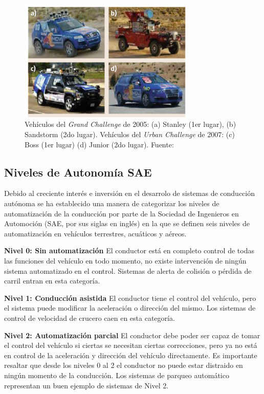 \begin{figure}[!h] 
    \centering
    \includegraphics[width=0.75\textwidth]{img/darpa}
    \caption[Vehículos del \textit{Grand Challenge}]{Vehículos del \textit{Grand Challenge} de 2005: (a) Stanley (1er lugar), (b) Sandstorm (2do lugar). Vehículos del \textit{Urban Challenge} de 2007: (c) Boss (1er lugar) (d) Junior (2do lugar). Fuente: \cite{wikipedia_2018} }
    \label{fig:darpa}
\end{figure}



    \subsection{Niveles de Autonomía SAE}
    Debido al creciente interés e inversión en el desarrolo de sistemas de conducción autónoma se ha establecido 
    una manera de categorizar los niveles de automatización de la conducción por parte de  la Sociedad de Ingenieros en Automoción
    (SAE, por sus siglas en inglés) en la que se definen seis niveles de automatización en vehículos terrestres, acuáticos y aéreos.

        \textbf{Nivel 0: Sin automatización}
        El conductor está en completo control de todas las funciones del vehículo en todo momento, no existe intervención 
        de ningún sistema automatizado en el control. Sistemas de alerta de colisión o pérdida de carril entran en esta categoría.
        
        \textbf{Nivel 1: Conducción asistida}
        El conductor tiene el control del vehículo, pero el sistema puede modificar la aceleración o dirección del mismo. Los 
        sistemas de control de velocidad de crucero caen en esta categoría.
        
        \textbf{Nivel 2: Automatización parcial}
        El conductor debe poder ser capaz de tomar el control del vehículo si ciertas se necesitan ciertas correcciones, pero  
        ya no está en control de la aceleración y dirección del vehículo directamente. Es importante resaltar que desde los
        niveles 0 al 2 el conductor no puede estar distraido en ningún momento de la conducción. Los sistemas de parqueo 
        automático representan un buen ejemplo de sistemas de Nivel 2.
        
